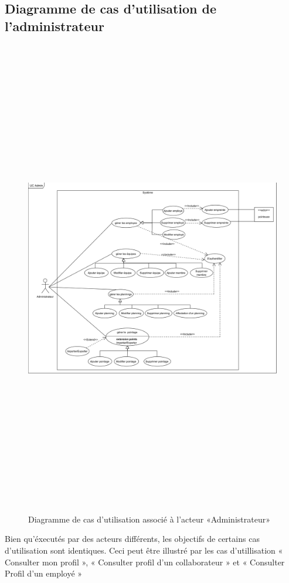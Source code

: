 \subsection{Diagramme de cas d'utilisation de l'administrateur}
    \begin{figure}[h!]
         \centering
         \includegraphics[angle=90, height=21cm]{images/uc_admin.png}
         \caption{Diagramme de cas d'utilisation associé à l'acteur «Administrateur»}
         \label{fig5}
    \end{figure}

\clearpage

Bien qu'éxecutés par des acteurs différents, les objectifs de certains cas d'utilisation  sont identiques. Ceci peut être illustré par les cas d'utillisation « Consulter mon profil », « Consulter profil d'un collaborateur » et « Consulter Profil d'un employé »

